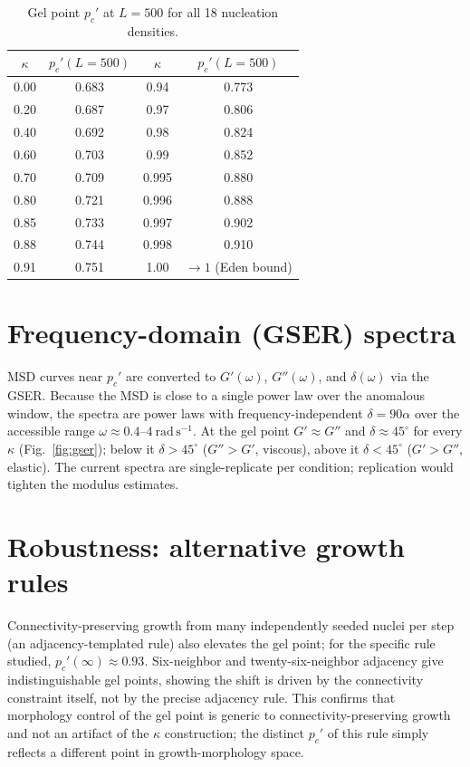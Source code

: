 \documentclass[aps,prl,onecolumn,superscriptaddress,nofootinbib]{revtex4-2}
\newcommand{\pcp}{p_c'}
\newcommand{\kap}{\kappa}
\begin{document}
\begin{table}[h]
\centering
\caption{Gel point $\pcp$ at $L=500$ for all 18 nucleation densities.}
\label{tab:kappa}
\begin{tabular}{cc@{\hspace{2em}}cc}
\toprule
$\kap$ & $\pcp(L{=}500)$ & $\kap$ & $\pcp(L{=}500)$ \\
\midrule
0.00 & 0.683 & 0.94  & 0.773 \\
0.20 & 0.687 & 0.97  & 0.806 \\
0.40 & 0.692 & 0.98  & 0.824 \\
0.60 & 0.703 & 0.99  & 0.852 \\
0.70 & 0.709 & 0.995 & 0.880 \\
0.80 & 0.721 & 0.996 & 0.888 \\
0.85 & 0.733 & 0.997 & 0.902 \\
0.88 & 0.744 & 0.998 & 0.910 \\
0.91 & 0.751 & 1.00  & $\to1$ (Eden bound) \\
\bottomrule
\end{tabular}
\end{table}

\section{Frequency-domain (GSER) spectra}
MSD curves near $\pcp$ are converted to $G'(\omega)$, $G''(\omega)$, and $\delta(\omega)$ via the
GSER. Because the MSD is close to a single power law over the anomalous window, the spectra are
power laws with frequency-independent $\delta=90\alpha$ over the accessible range
$\omega\approx0.4$--$4~\mathrm{rad\,s^{-1}}$. At the gel point $G'\approx G''$ and
$\delta\approx45^{\circ}$ for every $\kap$ (Fig.~\ref{fig:gser}); below it $\delta>45^{\circ}$
($G''>G'$, viscous), above it $\delta<45^{\circ}$ ($G'>G''$, elastic). The current spectra are
single-replicate per condition; replication would tighten the modulus estimates.

\section{Robustness: alternative growth rules}
Connectivity-preserving growth from many independently seeded nuclei per step (an
adjacency-templated rule) also elevates the gel point; for the specific rule studied,
$\pcp(\infty)\approx0.93$. Six-neighbor and twenty-six-neighbor adjacency give indistinguishable
gel points, showing the shift is driven by the connectivity constraint itself, not by the precise
adjacency rule. This confirms that morphology control of the gel point is generic to
connectivity-preserving growth and not an artifact of the $\kap$ construction; the distinct
$\pcp$ of this rule simply reflects a different point in growth-morphology space.
\end{document}
